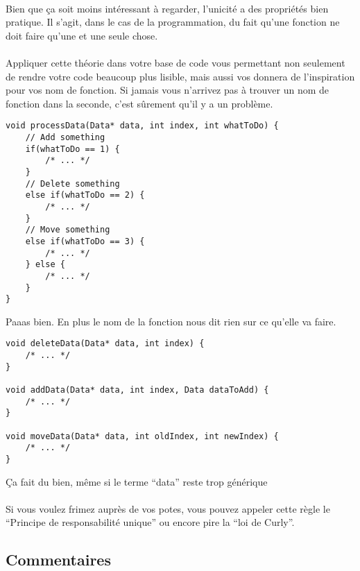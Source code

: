 \paragraph{} Bien que ça soit moins intéressant à regarder, l'unicité a des
propriétés bien pratique. Il s'agit, dans le cas de la programmation, du fait
qu'une fonction ne doit faire qu'une et une seule chose.

\paragraph{} Appliquer cette théorie dans votre base de code vous permettant
non seulement de rendre votre code beaucoup plus lisible, mais aussi vos
donnera de l'inspiration pour vos nom de fonction. Si jamais vous n'arrivez pas
à trouver un nom de fonction dans la seconde, c'est sûrement qu'il y a un
problème.

\begin{listing}[H]
	\centering
	\begin{verbatim}
void processData(Data* data, int index, int whatToDo) {
	// Add something
	if(whatToDo == 1) {
		/* ... */
	}
	// Delete something
	else if(whatToDo == 2) {
		/* ... */
	}
	// Move something
	else if(whatToDo == 3) {
		/* ... */
	} else {
		/* ... */
	}
}
	\end{verbatim}
	\caption{Paaas bien. En plus le nom de la fonction nous dit rien sur ce
		qu'elle va faire.}
\end{listing}

\begin{listing}[H]
	\centering
	\begin{verbatim}
void deleteData(Data* data, int index) {
	/* ... */
}

void addData(Data* data, int index, Data dataToAdd) {
	/* ... */
}

void moveData(Data* data, int oldIndex, int newIndex) {
	/* ... */
}
	\end{verbatim}
	\caption{Ça fait du bien, même si le terme ``data'' reste trop générique}
\end{listing}

\paragraph{} Si vous voulez frimez auprès de vos potes, vous pouvez appeler
cette règle le ``Principe de responsabilité unique'' ou encore pire la ``loi de
Curly''.

\subsection{Commentaires}

